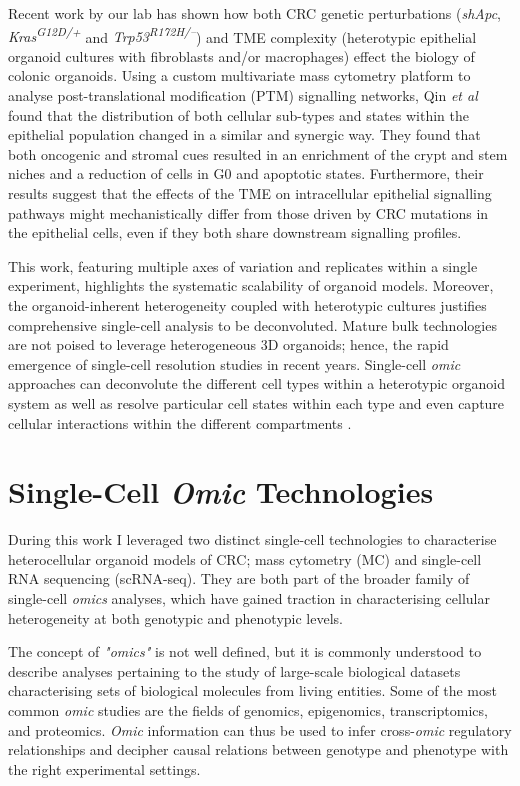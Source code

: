 Recent work by our lab \cite{qin_cell-type-specific_2020} has shown how both CRC genetic perturbations (\textit{shApc}, \textit{Kras\textsuperscript{G12D/+}} and \textit{Trp53\textsuperscript{R172H/–}}) and TME complexity (heterotypic epithelial organoid cultures with fibroblasts and/or macrophages) effect the biology of colonic organoids. Using a custom multivariate mass cytometry platform to analyse post-translational modification (PTM) signalling networks, Qin \textit{et al} \cite{qin_cell-type-specific_2020} found that the distribution of both cellular sub-types and states within the epithelial population changed in a similar and synergic way. They found that both oncogenic and stromal cues resulted in an enrichment of the crypt and stem niches and a reduction of cells in G0 and apoptotic states. Furthermore, their results suggest that the effects of the TME on intracellular epithelial signalling pathways might mechanistically differ from those driven by CRC mutations in the epithelial cells, even if they both share downstream signalling profiles.

This work, featuring multiple axes of variation and replicates within a single experiment, highlights the systematic scalability of organoid models. Moreover, the organoid-inherent heterogeneity coupled with heterotypic cultures justifies comprehensive single-cell analysis to be deconvoluted.
Mature bulk technologies are not poised to leverage heterogeneous 3D organoids; hence, the rapid emergence of single-cell resolution studies in recent years. Single-cell \emph{omic} approaches can deconvolute the different cell types within a heterotypic organoid system as well as resolve particular cell states within each type and even capture cellular interactions within the different compartments \cite{tape_heterocellular_2017}.


\section{Single-Cell \emph{Omic} Technologies}

During this work I leveraged two distinct single-cell technologies to characterise heterocellular organoid models of CRC; mass cytometry (MC) and single-cell RNA sequencing (scRNA-seq). They are both part of the broader family of single-cell \emph{omics} analyses, which have gained traction in characterising cellular heterogeneity at both genotypic and phenotypic levels. 

The concept of \emph{"omics"} is not well defined, but it is commonly understood to describe analyses pertaining to the study of large-scale biological datasets characterising sets of biological molecules from living entities. Some of the most common \emph{omic} studies are the fields of genomics, epigenomics, transcriptomics, and proteomics.
\emph{Omic} information can thus be used to infer cross-\emph{omic} regulatory relationships and decipher causal relations between genotype and phenotype with the right experimental settings.


